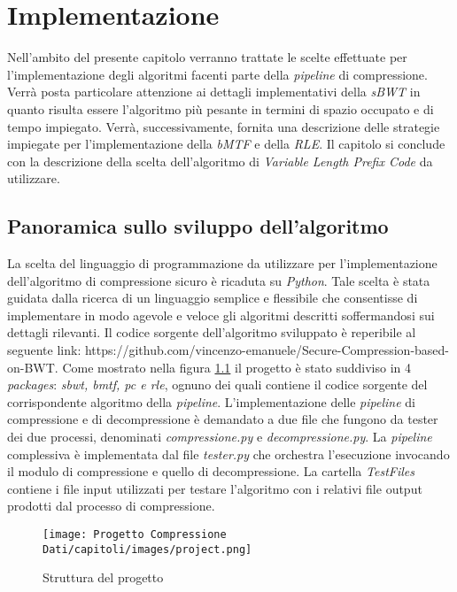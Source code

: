 \chapter{Implementazione} %
%

\begin{citazione}
Nell'ambito del presente capitolo verranno trattate le scelte effettuate per l'implementazione degli algoritmi facenti parte della \emph{pipeline} di compressione. Verrà posta particolare attenzione ai dettagli implementativi della \emph{sBWT} in quanto risulta essere l'algoritmo più pesante in termini di spazio occupato e di tempo impiegato. Verrà, successivamente, fornita una descrizione delle strategie impiegate per l'implementazione della \emph{bMTF} e della \emph{RLE}. Il capitolo si conclude con la descrizione della scelta dell'algoritmo di \emph{Variable Length Prefix Code} da utilizzare. 
\end{citazione}
\newpage

\section{Panoramica sullo sviluppo dell'algoritmo} 
La scelta del linguaggio di programmazione da utilizzare per l'implementazione dell'algoritmo di compressione sicuro è ricaduta su \emph{Python}. Tale scelta è stata guidata dalla ricerca di un linguaggio semplice e flessibile che consentisse di implementare in modo agevole e veloce gli algoritmi descritti soffermandosi sui dettagli rilevanti. Il codice sorgente dell'algoritmo sviluppato è reperibile al seguente link: https://github.com/vincenzo-emanuele/Secure-Compression-based-on-BWT. Come mostrato nella figura \ref{fig:project} il progetto è stato suddiviso in 4 \emph{packages}: \emph{sbwt, bmtf, pc e rle}, ognuno dei quali contiene il codice sorgente del corrispondente algoritmo della \emph{pipeline}. L'implementazione delle \emph{pipeline} di compressione e di decompressione è demandato a due file che fungono da tester dei due processi, denominati \emph{compressione.py} e \emph{decompressione.py}. La \emph{pipeline} complessiva è implementata dal file \emph{tester.py} che orchestra l'esecuzione invocando il modulo di compressione e quello di decompressione. La cartella \emph{TestFiles} contiene i file input utilizzati per testare l'algoritmo con i relativi file output prodotti dal processo di compressione.
\begin{figure}[h]
    \centering
    \texttt{[image: Progetto Compressione Dati/capitoli/images/project.png]}
\caption{Struttura del progetto}
    \label{fig:project}
\end{figure} \\
